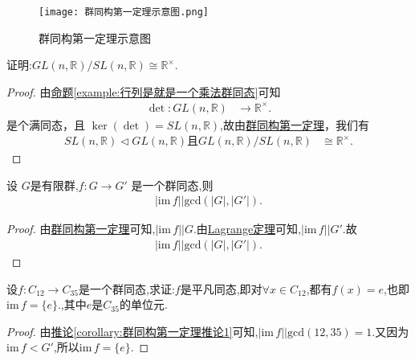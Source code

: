 \documentclass[../../main.tex]{subfiles}
\begin{document}
\begin{note}
\begin{figure}[H]
\centering
\texttt{[image: 群同构第一定理示意图.png]}
\caption{群同构第一定理示意图}
\label{figure:群同构第一定理示意图}
\end{figure}
\end{note}

\begin{example}
证明:$GL(n, \mathbb{R})/SL(n, \mathbb{R})\cong \mathbb{R}^{\times}$.
\end{example}
\begin{proof}
由\hyperref[example:行列是就是一个乘法群同态]{命题\ref{example:行列是就是一个乘法群同态}}可知
\begin{align*}
\det: GL(n, \mathbb{R}) &\to \mathbb{R}^{\times}.
\end{align*}
是个满同态，且 \(\ker(\det) = SL(n, \mathbb{R})\),故由\hyperref[theorem:群同构第一定理]{群同构第一定理}，我们有
\begin{align*}
SL(n, \mathbb{R}) \lhd GL(n, \mathbb{R})\text{且}GL(n, \mathbb{R})/SL(n, \mathbb{R}) &\cong \mathbb{R}^{\times}.
\end{align*} 
\end{proof}

\begin{corollary}\label{corollary:群同构第一定理推论1}
设 $G$是有限群,\(f: G \to G'\) 是一个群同态,则
\begin{align*}
\left| \mathrm{im}\,f \right|\Big | \mathrm{gcd}\left( \left| G \right|,\left| G'\right| \right) .
\end{align*}
\end{corollary}
\begin{proof}
由\hyperref[theorem:群同构第一定理]{群同构第一定理}可知,$\left| \mathrm{im}\,f \right|\Big | G$.由\hyperref[theorem:Lagrange定理]{Lagrange定理}可知,$\left| \mathrm{im}\,f \right|\Big | G'$.故
\begin{align*}
\left| \mathrm{im}\,f \right|\Big | \mathrm{gcd}\left( \left| G \right|,\left| G'\right| \right) .
\end{align*}
\end{proof}

\begin{example}
设$f:C_{12}\to C_{35}$是一个群同态,求证:$f$是平凡同态,即对$\forall x\in C_{12}$,都有$f(x)=e$,也即$\mathrm{im}\,f=\{e\}$.,其中$e$是$C_{35}$的单位元.
\end{example}
\begin{proof}
由\hyperref[corollary:群同构第一定理推论1]{推论\ref{corollary:群同构第一定理推论1}}可知,$\left| \mathrm{im}\,f \right|\Big | \mathrm{gcd}\left( 12,35 \right)=1 .$又因为$\mathrm{im}\,f<G'$,所以$\mathrm{im}\,f=\{e\}$.
\end{proof}
\end{document}
